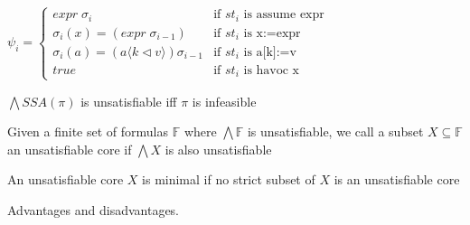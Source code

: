 \documentclass[a4paper]{article}
\begin{document}
\begin{minipage}[t]{0.16\linewidth}
\begin{betterlist}
{{\begin{betterlist}
\begin{betterlist}
						$\psi_i =
							\begin{cases}
								expr\;\sigma_i                                    & \text{if } st_i \text{ is  assume expr} \\
								\sigma_i(x) = (expr\;\sigma_{i−1})                & \text{if } st_i \text{ is  x:=expr}     \\
								\sigma_i(a) = (a⟨k \triangleleft v⟩) \sigma_{i−1} & \text{if } st_i \text{ is  a[k]:=v}     \\
								true                                              & \text{if } st_i \text{ is  havoc x}
							\end{cases}$
						\begin{betterlist}
							\item $\bigwedge SSA(\pi )$ is unsatisfiable iff $\pi$ is infeasible
						\end{betterlist}
						\item Given a finite set of formulas $\mathbb{F}$ where $\bigwedge \mathbb{F}$ is unsatisfiable, we call a subset $X \subseteq \mathbb{F}$ an \alert{unsatisfiable core} if $\bigwedge X$ is also unsatisfiable
						\begin{betterlist}
							\item An unsatisfiable core $X$ is \alert{minimal} if no strict subset of $X$ is an unsatisfiable core
						\end{betterlist}
					\end{betterlist}
				\end{betterlist}
			}}
    \item Advantages and disadvantages.
\end{betterlist}
\end{minipage}
\end{document}
